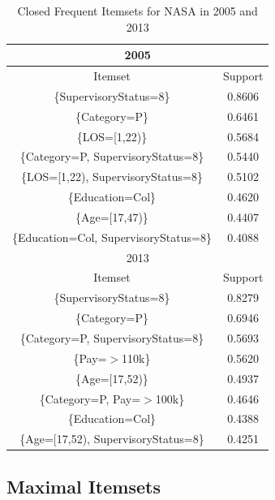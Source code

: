 \documentclass{article}
\begin{document}
    \begin{center}
        \begin{table}
            \centering
            \begin{tabular}{ |c|c| }
                \hline
                \multicolumn{2}{|c|}{2005} \\
                \hline
                Itemset & Support \\
                \hline
                \{SupervisoryStatus=8\} & 0.8606 \\
                \{Category=P\} & 0.6461 \\
                \{LOS=[1,22)\} & 0.5684 \\
                \{Category=P, SupervisoryStatus=8\} & 0.5440 \\
                \{LOS=[1,22), SupervisoryStatus=8\} & 0.5102 \\
                \{Education=Col\} & 0.4620 \\
                \{Age=[17,47)\} & 0.4407 \\
                \{Education=Col, SupervisoryStatus=8\} & 0.4088 \\
                \hline
                \multicolumn{2}{|c|}{2013} \\
                \hline
                Itemset & Support \\
                \hline
                \{SupervisoryStatus=8\} & 0.8279 \\
                \{Category=P\} & 0.6946 \\
                \{Category=P, SupervisoryStatus=8\} & 0.5693 \\
                \{Pay=$>$110k\} & 0.5620 \\
                \{Age=[17,52)\} & 0.4937 \\
                \{Category=P, Pay=$>$100k\} & 0.4646 \\
                \{Education=Col\} & 0.4388 \\
                \{Age=[17,52), SupervisoryStatus=8\} & 0.4251 \\
                \hline
            \end{tabular}
            \caption{Closed Frequent Itemsets for NASA in 2005 and 2013}
            \label{tab:6}
        \end{table}
    \end{center}

    \subsection{Maximal Itemsets}
\end{document}
